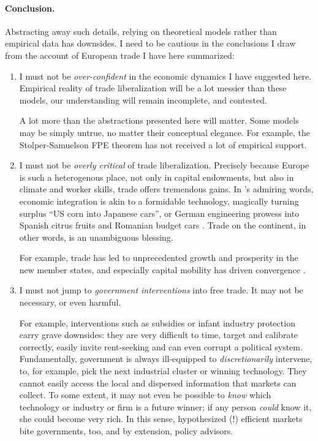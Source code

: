 \documentclass[11pt,a4paper,oneside]{article}
\begin{document}
\paragraph{Conclusion.}
Abstracting away such details, relying on theoretical models rather than empirical data has downsides.
I need to be cautious in the conclusions I draw from the account of European trade I have here summarized:
\begin{enumerate}
	\item I must not be \emph{over-confident} in the economic dynamics I have suggested here.
	Empirical reality of trade liberalization will be a lot messier than these models, our understanding will remain incomplete, and contested.

	A lot more than the abstractions presented here will matter.
	Some models may  be simply untrue, no matter their conceptual elegance.
	For example, the Stolper-Samuelson \gls{FPE} theorem has not received a lot of empirical support.

	\item I must not be \emph{overly critical} of trade liberalization.
	Precisely because Europe is such a heterogenous place, not only in capital endowments, but also in climate and worker skills, trade offers tremendous gains.
	In \citeauthor{Mankiw-2004-aa}'s admiring words, economic integration is akin to a formidable technology, magically turning surplus ``US corn into Japanese cars'', or German engineering prowess into Spanish citrus fruits and Romanian budget cars \citeyearpar[212]{Mankiw-2004-aa}.
	Trade on the continent, in other words, is an unambiguous blessing.

	For example, trade has led to unprecedented growth and prosperity in the new member states, and especially capital mobility has driven convergence \citep{Abiad2007}. %

	\item I must not jump to \emph{government interventions} into free trade.
	It may not be necessary, or even harmful.

	For example, interventions such as subsidies or infant industry protection carry grave downsides:
	they are very difficult to time, target and calibrate correctly, easily invite rent-seeking and can even corrupt a political system.
	Fundamentally, government is always ill-equipped to \emph{discretionarily} intervene, to, for example, pick the next industrial cluster or winning technology.
	They cannot easily access the local and dispersed information that markets can collect.
	To some extent, it may not even be possible to \emph{know} which technology or industry or firm is a future winner; if any person \emph{could} know it, she could become very rich.
	In this sense, hypothesized (!) efficient markets bite governments, too, and by extension, policy advisors.

\end{enumerate}
\end{document}
